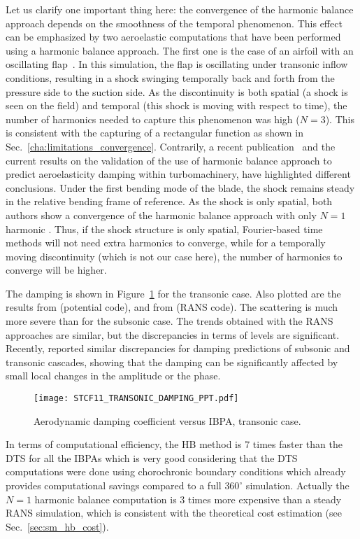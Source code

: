 Let us clarify one important thing here: 
the convergence of the harmonic balance approach depends
on the smoothness of the temporal phenomenon.
This effect can be emphasized by two 
aeroelastic computations that have been performed 
using a harmonic balance approach. 
The first one is the case of 
an airfoil with an oscillating 
flap~\cite{JDufour2009}. In this simulation, the flap is oscillating
under transonic inflow conditions, resulting in a shock swinging temporally
back and forth from the pressure side to the
suction side. As the discontinuity is
both spatial (a shock is seen on the field) and temporal
(this shock is moving with respect to time), the number
of harmonics needed to capture this phenomenon was high ($N=3$). This is
consistent with the capturing of a rectangular function
as shown in Sec.~\ref{cha:limitations_convergence}.
Contrarily, a recent publication~\cite{Huang2013a} and the
current results on the validation
of the use of harmonic balance approach to predict
aeroelasticity damping within turbomachinery, have highlighted
different conclusions. Under the first bending mode
of the blade, the shock remains  
steady in the relative bending frame
of reference. As the shock
is only spatial, both authors show a convergence of the
harmonic balance approach with only $N=1$ harmonic
. Thus, if the shock
structure is only spatial, Fourier-based time methods will not need
extra harmonics to converge, while for a temporally moving discontinuity
(which is not our case here), the number
of harmonics to converge will be higher. 

The damping is shown in Figure~\ref{fig:stcf11_transonic_damping} for
the transonic case. Also plotted are the results from
\citet{Fransson1999} (potential code), and 
from \citet{Cinnella2004} (RANS code). The scattering is much more severe
than for the subsonic case. The trends obtained with the RANS 
approaches are similar, but the discrepancies in terms of
levels are significant.
Recently, \citet{Vogt2011} reported similar discrepancies 
for damping predictions of subsonic and transonic cascades, 
showing that the damping can be significantly affected by 
small local changes in the amplitude or the phase.
\begin{figure}[htp]
  \centering
  \texttt{[image: STCF11\_TRANSONIC\_DAMPING\_PPT.pdf]}
  \caption{Aerodynamic damping coefficient versus IBPA, transonic case.}
  \label{fig:stcf11_transonic_damping}
\end{figure}

In terms of computational efficiency, the HB method is 7 times faster
than the DTS for all the IBPAs which is very good considering 
that the DTS computations
were done using chorochronic boundary conditions which already
provides computational savings compared to a
full $360^\circ$ simulation. Actually the $N=1$ harmonic
balance computation is 3 times more expensive than a
steady RANS simulation, which is consistent with the
theoretical cost estimation (see Sec.~\ref{sec:sm_hb_cost}).

